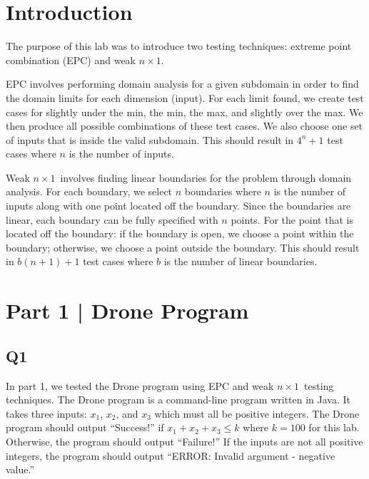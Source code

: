 \documentclass[12pt, letterpaper, titlepage]{article}
\title{\textbf{\Huge{
    \begin{center}
        ECE 322 Lab Report \#2
    \end{center}
}}}
\author{
\B enjamin Kong \\
1573684 \\
}
\newcommand{\nx}{$n\times1$}
\begin{document}
 
\onehalfspacing

\maketitle
\newpage

\tableofcontents
\newpage

\section{Introduction}
The purpose of this lab was to introduce two testing techniques: extreme point combination (EPC) and weak \nx. 

EPC involves performing domain analysis for a given subdomain in order to find the domain limits for each dimension (input). For each limit found, we create test cases for slightly under the min, the min, the max, and slightly over the max. We then produce all possible combinations of these test cases. We also choose one set of inputs that is inside the valid subdomain. This should result in $4^n+1$ test cases where $n$ is the number of inputs. 

Weak \nx\ involves finding linear boundaries for the problem through domain analysis. For each boundary, we select $n$ boundaries where $n$ is the number of inputs along with one point located off the boundary. Since the boundaries are linear, each boundary can be fully specified with $n$ points. For the point that is located off the boundary: if the boundary is open, we choose a point within the boundary; otherwise, we choose a point outside the boundary. This should result in $b(n+1)+1$ test cases where $b$ is the number of linear boundaries.

\section{Part 1 | Drone Program}
\subsection*{Q1}
In part 1, we tested the Drone program using EPC and weak \nx\ testing techniques. The Drone program is a command-line program written in Java. It takes three inputs: $x_1$, $x_2$, and $x_3$ which must all be positive integers. The Drone program should output ``Success!'' if $x_1 + x_2 + x_3 \leq k$ where $k=100$ for this lab. Otherwise, the program should output ``Failure!'' If the inputs are not all positive integers, the program should output ``ERROR: Invalid argument - negative value.''
\end{document}
